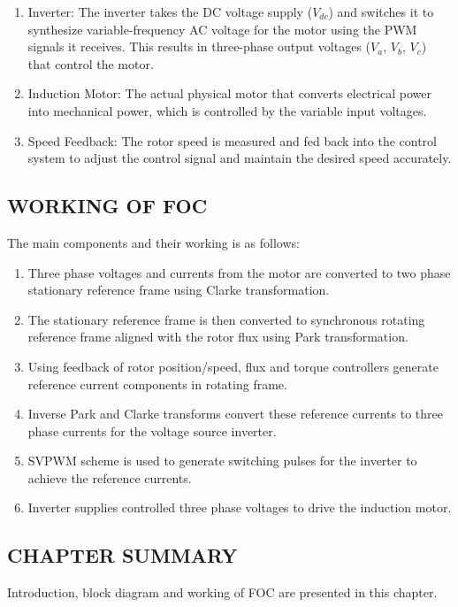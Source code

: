 \begin{enumerate}
  \item {Inverter:} The inverter takes the DC voltage supply ($V_{dc}$) and switches it to synthesize variable-frequency AC voltage for the motor using the PWM signals it receives. This results in three-phase output voltages ($V_a$, $V_b$, $V_c$) that control the motor.
  
  \item {Induction Motor:} The actual physical motor that converts electrical power into mechanical power, which is controlled by the variable input voltages.

  \item {Speed Feedback:} The rotor speed is measured and fed back into the control system to adjust the control signal and maintain the desired speed accurately.
\end{enumerate}





\subsection{WORKING OF FOC}
The main components and their working is as follows:

\begin{enumerate}
    
\item Three phase voltages and currents from the motor are converted to two phase stationary reference frame using Clarke transformation.

\item The stationary reference frame is then converted to synchronous rotating reference frame aligned with the rotor flux using Park transformation.

\item Using feedback of rotor position/speed, flux and torque controllers generate reference current components in rotating frame.

\item Inverse Park and Clarke transforms convert these reference currents to three phase currents for the voltage source inverter.

\item SVPWM scheme is used to generate switching pulses for the inverter to achieve the reference currents.

\item Inverter supplies controlled three phase voltages to drive the induction motor.

\end{enumerate}

\subsection{CHAPTER SUMMARY}
\hspace{0.2in} Introduction, block diagram and working of FOC are presented in this chapter.

\newpage